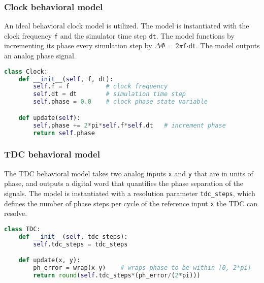 \subsubsection{Clock behavioral model}
An ideal behavioral clock model is utilized. The model is instantiated with the clock frequency \texttt{f} and the simulator time step \texttt{dt}. The model functions by incrementing its phase every simulation step by $\Delta \Phi$ = $2\pi$\texttt{f}$\cdot$\texttt{dt}. The model outputs an analog phase signal.

\begin{lstlisting}[language={Python}, caption={Ideal clock behavioral model.}, label={clk_code}]
class Clock:
	def __init__(self, f, dt):
		self.f = f 			# clock frequency
		self.dt = dt 		# simulation time step
		self.phase = 0.0	# clock phase state variable

	def update(self):
		self.phase += 2*pi*self.f*self.dt 	# increment phase
		return self.phase
    \end{lstlisting}

\subsubsection{TDC behavioral model}
The TDC behavioral model takes two analog inputs \texttt{x} and \texttt{y} that are in units of phase, and outputs a digital word that quantifies the phase separation of the signals. The model is instantiated with a resolution parameter \texttt{tdc\_steps}, which defines the number of phase steps per cycle of the reference input \texttt{x} the TDC can resolve.

\begin{lstlisting}[language={Python}, caption={TDC behavioral model.}, label={tdc_code}]
class TDC:
	def __init__(self, tdc_steps):
		self.tdc_steps = tdc_steps

	def update(x, y):
		ph_error = wrap(x-y) 	# wraps phase to be within [0, 2*pi]
		return round(self.tdc_steps*(ph_error/(2*pi)))
\end{lstlisting}
